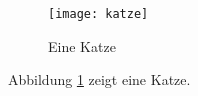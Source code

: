 \begin{figure}
  \texttt{[image: katze]}
  \caption{Eine Katze}
  \label{fig:katze}
\end{figure}
Abbildung \ref{fig:katze}
zeigt eine Katze.
